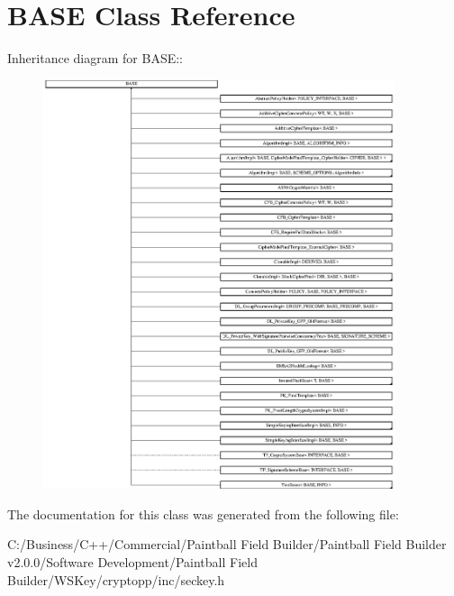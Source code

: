 \hypertarget{class_b_a_s_e}{
\section{BASE Class Reference}
\label{class_b_a_s_e}
}
Inheritance diagram for BASE::\begin{figure}[H]
\begin{center}
\leavevmode
\includegraphics[height=12cm]{class_b_a_s_e}
\end{center}
\end{figure}


The documentation for this class was generated from the following file:\begin{DoxyCompactItemize}
\item 
C:/Business/C++/Commercial/Paintball Field Builder/Paintball Field Builder v2.0.0/Software Development/Paintball Field Builder/WSKey/cryptopp/inc/seckey.h\end{DoxyCompactItemize}
